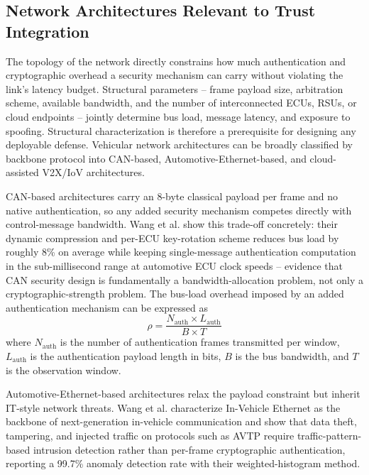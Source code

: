 \documentclass[journal]{IEEEtran}
\begin{document}
	\subsection{Network Architectures Relevant to Trust Integration}
	
	The topology of the network directly constrains how much authentication
	and cryptographic overhead a security mechanism can carry without
	violating the link's latency budget. Structural parameters -- frame
	payload size, arbitration scheme, available bandwidth, and the number
	of interconnected ECUs, RSUs, or cloud endpoints -- jointly determine
	bus load, message latency, and exposure to spoofing. Structural
	characterization is therefore a prerequisite for designing any
	deployable defense. Vehicular network architectures can be broadly
	classified by backbone protocol into CAN-based, Automotive-Ethernet-based,
	and cloud-assisted V2X/IoV architectures.
	
	CAN-based architectures carry an 8-byte classical payload per frame and
	no native authentication, so any added security mechanism competes
	directly with control-message bandwidth. Wang et al. \cite{ref21} show
	this trade-off concretely: their dynamic compression and per-ECU
	key-rotation scheme reduces bus load by roughly 8\% on average while
	keeping single-message authentication computation in the
	sub-millisecond range at automotive ECU clock speeds -- evidence that
	CAN security design is fundamentally a bandwidth-allocation problem,
	not only a cryptographic-strength problem. The bus-load overhead
	imposed by an added authentication mechanism can be expressed as
	\begin{equation}
		\rho = \frac{N_{\text{auth}} \times L_{\text{auth}}}{B \times T}
		\label{eq:busload}
	\end{equation}
	where $N_{\text{auth}}$ is the number of authentication frames
	transmitted per window, $L_{\text{auth}}$ is the authentication
	payload length in bits, $B$ is the bus bandwidth, and $T$ is the
	observation window.
	
	Automotive-Ethernet-based architectures relax the payload constraint but
	inherit IT-style network threats. Wang et al. \cite{ref28} characterize
	In-Vehicle Ethernet as the backbone of next-generation in-vehicle
	communication and show that data theft, tampering, and injected traffic
	on protocols such as AVTP require traffic-pattern-based intrusion
	detection rather than per-frame cryptographic authentication, reporting
	a 99.7\% anomaly detection rate with their weighted-histogram method.
	
\end{document}

